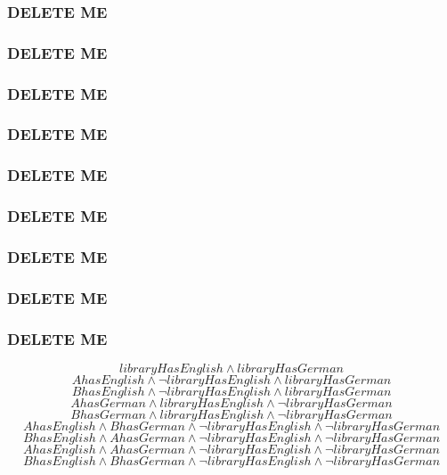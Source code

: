 \documentclass{beamer}
\begin{document}
 
 \begin{frame}
\frametitle{DELETE ME}

 \end{frame} 
 
 
 \begin{frame}
\frametitle{DELETE ME}

 \end{frame} 

 \begin{frame}
\frametitle{DELETE ME}

 \end{frame} 
 
 
 \begin{frame}
\frametitle{DELETE ME}

 \end{frame} 
 
 
 \begin{frame}
\frametitle{DELETE ME}

 \end{frame} 
 
 
 \begin{frame}
\frametitle{DELETE ME}

 \end{frame} 
 
 
 \begin{frame}
\frametitle{DELETE ME}

 \end{frame} 
 
 
 \begin{frame}
\frametitle{DELETE ME}

 \end{frame} 
 
 
 
 
 
 
 
 
 
 
 
 
 
 
 
 
 
 
 
 
 
 
\begin{frame}
\frametitle{DELETE ME}

\[
libraryHasEnglish \land libraryHasGerman
\]
\[
AhasEnglish \land \lnot libraryHasEnglish \land libraryHasGerman
\]
\[
BhasEnglish \land \lnot libraryHasEnglish \land libraryHasGerman
\]
\[
AhasGerman \land libraryHasEnglish \land \lnot libraryHasGerman
\]
\[
BhasGerman \land libraryHasEnglish \land \lnot libraryHasGerman
\]
\[
AhasEnglish \land BhasGerman \land \lnot libraryHasEnglish \land \lnot libraryHasGerman
\]
\[
BhasEnglish \land AhasGerman \land \lnot libraryHasEnglish \land \lnot libraryHasGerman
\]
\[
AhasEnglish \land AhasGerman \land \lnot libraryHasEnglish \land \lnot libraryHasGerman
\]
\[
BhasEnglish \land BhasGerman \land \lnot libraryHasEnglish \land \lnot libraryHasGerman
\]

 \end{frame}
\end{document}
